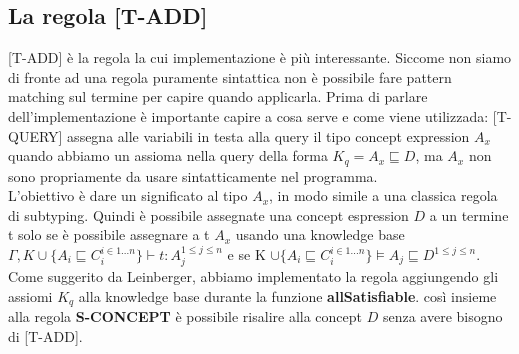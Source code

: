             \subsection{La regola [T-ADD]}
            [T-ADD] è la regola la cui implementazione è più interessante. Siccome non siamo di fronte ad una regola puramente sintattica
            non è possibile fare pattern matching sul termine per capire quando applicarla.
            Prima di parlare dell'implementazione è importante capire a cosa serve e come viene utilizzada: [T-QUERY] assegna alle variabili in testa alla query
            il tipo concept expression $A_x$ quando abbiamo un assioma nella query della forma $K_q = A_x \sqsubseteq D$, ma $A_x$ non sono propriamente da usare sintatticamente nel programma.
            \\L'obiettivo è dare un significato al tipo $A_x$, in modo simile a una classica regola di subtyping. Quindi è possibile assegnate una concept espression $D$
            a un termine t solo se è possibile assegnare a t $A_x$ usando una knowledge base $\Gamma,K \cup \{A_i \sqsubseteq C_i^{i \in 1...n}\} \vdash t : A_j^{1 \leq j \leq n}$
            e se K $\cup \{A_i \sqsubseteq C_i^{i \in 1...n}\} \vDash A_j \sqsubseteq D^{1 \leq j \leq n}$.
            \\Come suggerito da Leinberger, abbiamo implementato la regola aggiungendo gli assiomi $K_q$ alla knowledge base durante la funzione \textbf{allSatisfiable}.
            così insieme alla regola \textbf{S-CONCEPT} è possibile risalire alla concept $D$ senza avere bisogno di [T-ADD].
